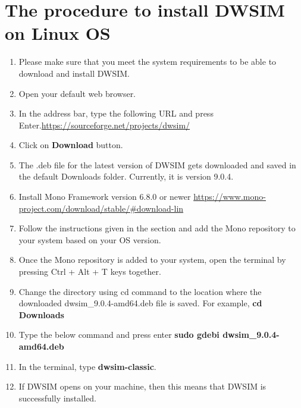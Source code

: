 \documentclass[a4paper,12pt]{article}
\begin{document}
\section{The procedure to install DWSIM on Linux OS}

\begin{enumerate}
\item Please make sure that you meet the system requirements to be able to download and install DWSIM.
\item Open your default web browser.
\item In the address bar, type the following URL and press Enter.\newline \url{https://sourceforge.net/projects/dwsim/}
\item Click on \textbf{Download} button.
\item The .deb file for the latest version of DWSIM gets downloaded and saved in the default Downloads folder. Currently, it is version 9.0.4.
\item Install Mono Framework version 6.8.0 or newer
\newline \url{https://www.mono-project.com/download/stable/#download-lin}
\item Follow the instructions given in the section and add the Mono repository to your system based on your OS version. 
\item Once the Mono repository is added to your system, open the terminal by pressing Ctrl + Alt + T keys together.
\item Change the directory using cd command to the location where the downloaded dwsim\_9.0.4-amd64.deb file is saved. For example, \textbf{cd Downloads}
\item Type the below command and press enter
\newline \textbf{sudo gdebi dwsim\_9.0.4-amd64.deb}
\item In the terminal, type \textbf{dwsim-classic}.
\item If DWSIM opens on your machine, then this means that DWSIM is successfully installed.

\end{enumerate}

\end{document}
